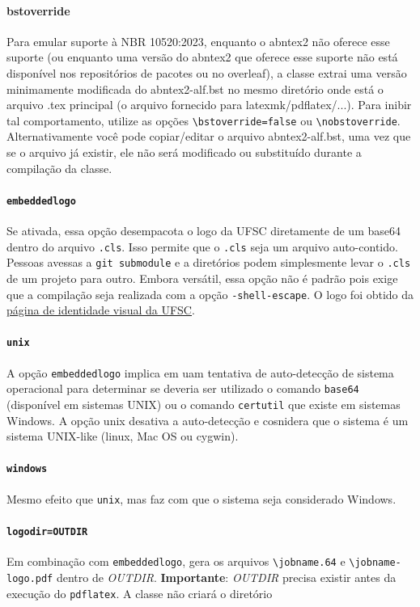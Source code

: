 \documentclass[embeddedlogo]{ufsc-thesis-rn46-2019}
\newcommand{\lacmd}[1]{\texttt{\textbackslash{}#1}}
\begin{document}
\paragraph*{bstoverride} Para emular suporte à NBR 10520:2023, enquanto o
abntex2 não oferece esse suporte (ou enquanto uma versão do abntex2 que oferece
esse suporte não está disponível nos repositórios de pacotes ou no overleaf), a
classe extrai uma versão minimamente modificada do abntex2-alf.bst no mesmo
diretório onde está o arquivo .tex principal (o arquivo fornecido para
latexmk/pdflatex/...). Para inibir tal comportamento, utilize as opções
\lacmd{bstoverride=false} ou \lacmd{nobstoverride}. Alternativamente você pode
copiar/editar o arquivo abntex2-alf.bst, uma vez que se o arquivo já existir,
ele não será modificado ou substituído durante a compilação da classe.

\paragraph*{\texttt{embeddedlogo}} Se ativada, essa opção desempacota o logo da
UFSC diretamente de um base64 dentro do arquivo \texttt{.cls}. Isso permite que
o \texttt{.cls} seja um arquivo auto-contido. Pessoas avessas a \texttt{git
  submodule} e a diretórios podem simplesmente levar o \texttt{.cls} de um
projeto para outro. Embora versátil, essa opção não é padrão pois exige que a
compilação seja realizada com a opção \texttt{-shell-escape}. O logo foi obtido
da \href{http://identidade.ufsc.br/}{página de identidade visual da UFSC}. 

\paragraph*{\texttt{unix}} A opção \texttt{embeddedlogo} implica em uam
tentativa de auto-detecção de sistema operacional para determinar se deveria ser
utilizado o comando \texttt{base64} (disponível em sistemas UNIX) ou o comando
\texttt{certutil} que existe em sistemas Windows. A opção unix desativa a
auto-detecção e cosnidera que o sistema é um sistema UNIX-like (linux, Mac OS ou
cygwin).

\paragraph*{\texttt{windows}} Mesmo efeito que \texttt{unix}, mas faz com que o
sistema seja considerado Windows.

{\sloppy
\paragraph*{\texttt{logodir=OUTDIR}} Em combinação com \texttt{embeddedlogo},
gera os arquivos \lacmd{jobname.64} e \lacmd{jobname-logo.pdf} dentro de
\emph{OUTDIR}. \textbf{Importante}: \emph{OUTDIR} precisa existir antes da
execução do \texttt{pdflatex}. A classe não criará o diretório
\par}
\end{document}
